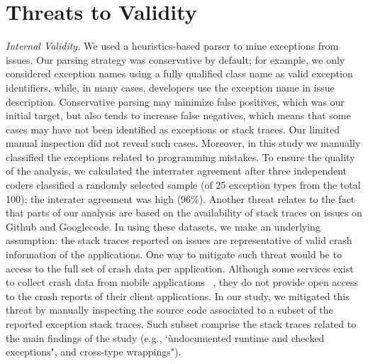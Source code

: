 \documentclass[conference]{IEEEtran}
\begin{document}



\section{Threats to Validity}
\label{sec:threats}

\noindent\emph{Internal Validity.} We used a heuristics-based parser to mine
exceptions from issues.  Our parsing strategy was conservative by default; for
example, we only considered exception names using a fully qualified class name
as valid exception identifiers, while, in many cases, developers use the
exception name in issue description. Conservative parsing may minimize false
positives, which was our initial target, but also tends to increase false
negatives, which means that some cases may have not been identified as
exceptions or stack traces. Our limited manual inspection did not reveal such
cases. Moreover, in this study we manually classified the exceptions 
related to programming mistakes. To ensure the quality of the analysis, 
we calculated the interrater agreement after three independent 
coders classified a randomly selected sample (of 25 exception 
types from the total 100); the interater agreement was high (96\%). 
Another threat relates to the fact that parts of our analysis 
are based on the availability of stack traces on issues on Github and Googlecode. 
In using these datasets, we make an underlying assumption: the stack traces reported on issues are 
representative of valid crash information of the applications. 
One way to mitigate such threat would be to access to the full 
set of crash data per application. Although some services exist 
to collect crash data from mobile applications ~\cite{BugSe14,BugSn14,Googl14,Acra14},
they do not provide open access to the crash reports of their client applications.
In our study, we mitigated this threat by manually inspecting
the source code associated to a subset of the reported exception stack traces.
Such subset comprise the stack traces related to the main findings 
of the study (e.g., `ùndocumented runtime and checked exceptions",
and cross-type wrappings").
\end{document}
